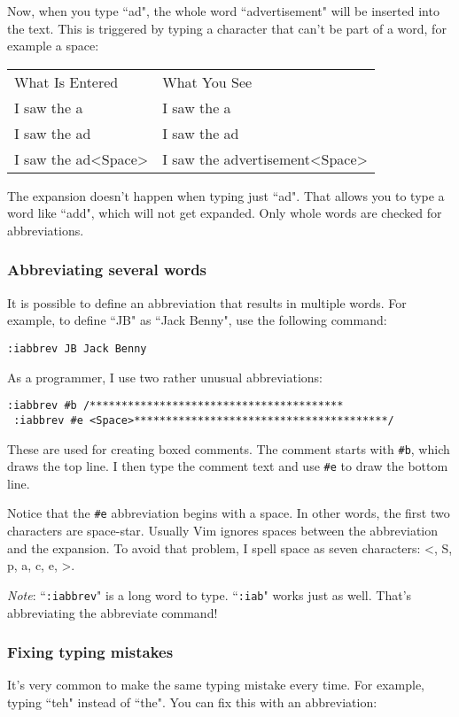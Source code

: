 Now, when you type ``ad", the whole word ``advertisement" will be inserted into the text.
This is triggered by typing a character that can't be part of a word, for example a space:

\begin{center} \begin{tabular}{l l}
				What Is Entered & What You See \\
				I saw the a & I saw the a \\
				I saw the ad & I saw the ad \\
				I saw the ad<Space> & I saw the advertisement<Space> \\
\end{tabular} \end{center}
The expansion doesn't happen when typing just ``ad".
That allows you to type a word like ``add", which will not get expanded.
Only whole words are checked for abbreviations.
\subsubsection{Abbreviating several words}
It is possible to define an abbreviation that results in multiple words.
For example, to define ``JB" as ``Jack Benny", use the following command:

\begin{Verbatim}[samepage=true]
 :iabbrev JB Jack Benny
\end{Verbatim}

As a programmer, I use two rather unusual abbreviations:

\begin{Verbatim}[samepage=true]
 :iabbrev #b /****************************************
 :iabbrev #e <Space>****************************************/
\end{Verbatim}

These are used for creating boxed comments.
The comment starts with \texttt{\#b}, which draws the top line.
I then type the comment text and use \texttt{\#e} to draw the bottom line.

Notice that the \texttt{\#e} abbreviation begins with a space.
In other words, the first two characters are space-star.
Usually Vim ignores spaces between the abbreviation and the expansion.
To avoid that problem, I spell space as seven characters: <, S, p, a, c, e, >.

\emph{Note}: ``\texttt{:iabbrev}" is a long word to type.
``\texttt{:iab}" works just as well.
That's abbreviating the abbreviate command!
\subsubsection{Fixing typing mistakes}
It's very common to make the same typing mistake every time.
For example, typing ``teh" instead of ``the".
You can fix this with an abbreviation:

